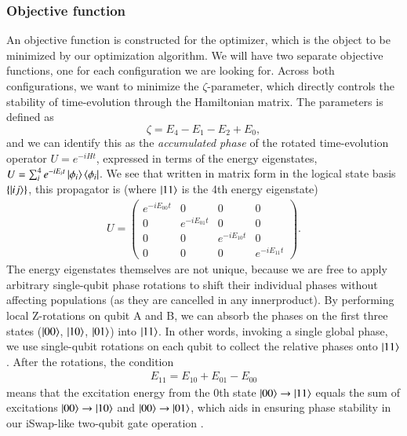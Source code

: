 \documentclass{subfiles}
\begin{document}
\subsubsection{Objective function}
An objective function is constructed for the optimizer, which is the object to be minimized by our optimization algorithm. We will have two separate objective functions, one for each configuration we are looking for. Across both configurations, we want to minimize the $\zeta$-parameter, which directly controls the stability of time-evolution through the Hamiltonian matrix. The parameters is defined as 
\begin{equation}
    \zeta = E_4 - E_1 - E_2 + E_0,\label{eq:zeta}
\end{equation}
and we can identify this as the \emph{accumulated phase} of the rotated time-evolution operator $U = e^{-iHt}$, expressed in terms of the energy eigenstates, $U = \sum_i^4 e^{-iE_it}\ket{\phi_i}\bra{\phi_i}$. We see that written in matrix form in the logical state basis $\{\ket{ij}\}$, this propagator is (where $\ket{11}$ is the 4th energy eigenstate)
\begin{align*}
    U = \begin{pmatrix}
        e^{-iE_{00}t} & 0 & 0 & 0 \\
        0 & e^{-iE_{01}t} & 0 & 0 \\
        0 & 0 & e^{-iE_{10}t} & 0 \\
        0 & 0 & 0 & e^{-iE_{11}t}
    \end{pmatrix}.
\end{align*}
The energy eigenstates themselves are not unique, because we are free to apply arbitrary single-qubit phase rotations to shift their individual phases without affecting populations (as they are cancelled in any innerproduct). By performing local Z-rotations on qubit A and B, we can absorb the phases on the first three states ($\ket{00}$, $\ket{10}$, $\ket{01}$) into $\ket{11}$. In other words, invoking a single global phase, we use single-qubit rotations on each qubit to collect the relative phases onto $\ket{11}$. After the rotations, the condition
\begin{align*}
    E_{11} = E_{10} + E_{01} - E_{00}
\end{align*}
means that the excitation energy from the 0th state $\ket{00}\to\ket{11}$ equals the sum of excitations $\ket{00}\to\ket{10}$ and $\ket{00}\to\ket{01}$, which aids in ensuring phase stability in our iSwap-like two-qubit gate operation \cite{ku2020suppression}. 
\\
\end{document}
